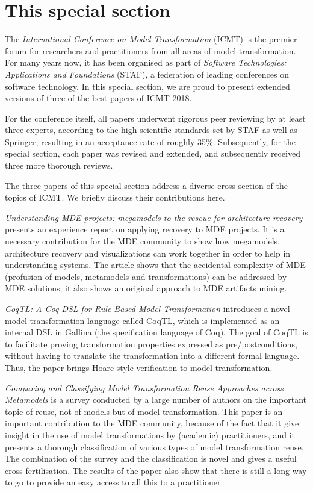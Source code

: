 \documentclass[twocolumn,final]{svjour3}
\begin{document}
\section{This special section}

The \emph{International Conference on Model Transformation} (ICMT) is the premier forum for researchers and practitioners from all areas of model transformation. For many years now, it has been organised as part of \emph{Software Technologies: Applications and Foundations} (STAF), a federation of leading conferences on software technology. In this special section, we are proud to present extended versions of three of the best papers of ICMT 2018.

For the conference itself, all papers underwent rigorous peer reviewing by at least three experts, according to the high scientific standards set by STAF as well as Springer, resulting in an acceptance rate of roughly 35\%. Subsequently, for the special section, each paper was revised and extended, and subsequently received three more thorough reviews.

\medskip\noindent The three papers of this special section address a diverse cross-section of the topics of ICMT. We briefly discuss their contributions here.

\emph{Understanding {MDE} projects: megamodels to the rescue for architecture recovery} \cite{Understanding-MDE} presents an experience report on applying recovery to MDE projects. It is a necessary contribution for the MDE community to show how megamodels, architecture recovery and visualizations can work  together in order to help in understanding systems. The article shows that the accidental complexity of MDE (profusion of models, metamodels and transformations) can be addressed by MDE solutions; it also shows an original approach to MDE artifacts mining. 

\emph{{CoqTL}: A {Coq} {DSL} for Rule-Based Model Transformation} \cite{CoqTL} introduces a novel model transformation language called CoqTL, which
is implemented as an internal DSL in Gallina (the specification language of Coq). The goal of CoqTL is to facilitate proving transformation properties expressed as pre/postconditions, without having to translate the transformation into a different formal language. Thus, the paper brings Hoare-style verification to model transformation.

\emph{Comparing and Classifying Model Transformation Reuse Approaches across Metamodels} \cite{Transformation-Reuse} is a survey conducted by a large number of authors on the important topic of reuse, not of models but of model transformation. This paper is an important contribution to the MDE community, because of the fact that it give insight in the use of model transformations by (academic) practitioners, and it presents a thorough classification of various types of model transformation reuse. The combination of the survey and the classification is novel and gives a useful cross fertilisation. The results of the paper also show that there is still a long way to go to provide an easy access to all this to a practitioner.
\end{document}
